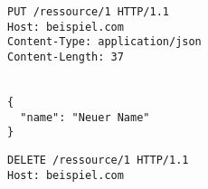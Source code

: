 \documentclass[../vs-script-first-v01.tex]{subfiles}
\begin{document}
\noindent\begin{minipage}{\textwidth}
\begin{lstlisting}[caption={Ressource updaten (Put)},captionpos=b,label={lst:update}]
PUT /ressource/1 HTTP/1.1
Host: beispiel.com
Content-Type: application/json
Content-Length: 37


{
  "name": "Neuer Name"
}

\end{lstlisting}
\end{minipage}

\noindent\begin{minipage}{\textwidth}
\begin{lstlisting}[caption={Ressource löschen (delete)},captionpos=b,label={lst:delete}]
DELETE /ressource/1 HTTP/1.1
Host: beispiel.com

\end{lstlisting}
\end{minipage}
\end{document}
